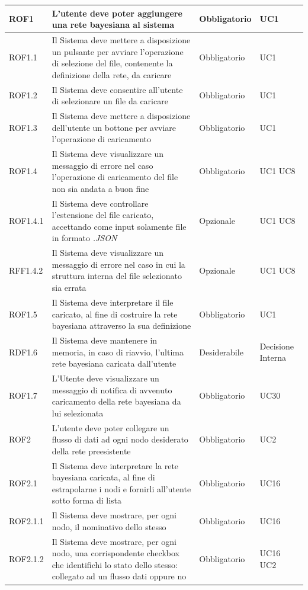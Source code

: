 \begin{center}
\begin{longtable}[c]{|m{}|m{}|m{}|m{}|}
ROF1 & L'utente deve poter aggiungere una rete bayesiana al sistema & Obbligatorio & UC1\\
\hline
\rowcolor{grigio}ROF1.1 & Il Sistema deve mettere a disposizione un pulsante per avviare l'operazione di selezione del file, contenente la definizione della rete, da caricare & Obbligatorio & UC1\\
\hline
ROF1.2 & Il Sistema deve consentire all'utente di selezionare un file da caricare & Obbligatorio & UC1\\
\hline
\rowcolor{grigio}ROF1.3 & Il Sistema deve mettere a disposizione dell'utente un bottone per avviare l'operazione di caricamento & Obbligatorio & UC1\\
\hline
ROF1.4 & Il Sistema deve visualizzare un messaggio di errore nel caso l'operazione di caricamento del file non sia andata a buon fine & Obbligatorio & UC1 UC8\\
\hline
\rowcolor{grigio}ROF1.4.1 & Il Sistema deve controllare l'estensione del file caricato, accettando come input solamente file in formato \textit{.JSON} & Opzionale & UC1 UC8\\
\hline
RFF1.4.2 & Il Sistema deve visualizzare un messaggio di errore nel caso in cui la struttura interna del file selezionato sia errata & Opzionale & UC1 UC8\\
\hline
\rowcolor{grigio}ROF1.5 & Il Sistema deve interpretare il file caricato, al fine di costruire la rete bayesiana attraverso la sua definizione & Obbligatorio & UC1\\
\hline
RDF1.6 & Il Sistema deve mantenere in memoria, in caso di riavvio, l'ultima rete bayesiana caricata dall'utente & Desiderabile & Decisione Interna\\
\hline
\rowcolor{grigio}ROF1.7 & L'Utente deve visualizzare un messaggio di notifica di avvenuto caricamento della rete bayesiana da lui selezionata & Obbligatorio & UC30\\
\hline
ROF2 & L'utente deve poter collegare un flusso di dati ad ogni nodo desiderato della rete preesistente & Obbligatorio & UC2\\
\hline
\rowcolor{grigio}ROF2.1 & Il Sistema deve interpretare la rete bayesiana caricata, al fine di estrapolarne i nodi e fornirli all'utente sotto forma di lista & Obbligatorio & UC16\\
\hline
ROF2.1.1 & Il Sistema deve mostrare, per ogni nodo, il nominativo dello stesso & Obbligatorio & UC16\\
\hline
\rowcolor{grigio}ROF2.1.2 & Il Sistema deve mostrare, per ogni nodo, una corrispondente checkbox che identifichi lo stato dello stesso: collegato ad un flusso dati oppure no & Obbligatorio & UC16 UC2\\

\end{longtable}
\end{center}
